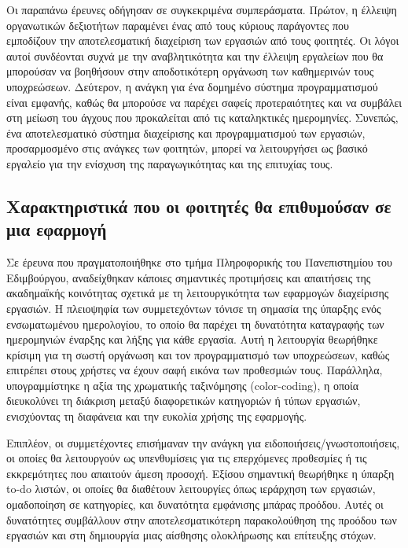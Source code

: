             Οι παραπάνω έρευνες οδήγησαν σε συγκεκριμένα συμπεράσματα. Πρώτον, η έλλειψη οργανωτικών δεξιοτήτων παραμένει ένας από τους κύριους παράγοντες που εμποδίζουν την αποτελεσματική διαχείριση των εργασιών από τους φοιτητές. Οι λόγοι αυτοί συνδέονται συχνά με την αναβλητικότητα και την έλλειψη εργαλείων που θα μπορούσαν να βοηθήσουν στην αποδοτικότερη οργάνωση των καθημερινών τους υποχρεώσεων. Δεύτερον, η ανάγκη για ένα δομημένο σύστημα προγραμματισμού είναι εμφανής, καθώς θα μπορούσε να παρέχει σαφείς προτεραιότητες και να συμβάλει στη μείωση του άγχους που προκαλείται από τις καταληκτικές ημερομηνίες. Συνεπώς, ένα αποτελεσματικό σύστημα διαχείρισης και προγραμματισμού των εργασιών, προσαρμοσμένο στις ανάγκες των φοιτητών, μπορεί να λειτουργήσει ως βασικό εργαλείο για την ενίσχυση της παραγωγικότητας και της επιτυχίας τους.

        \subsection{Χαρακτηριστικά που οι φοιτητές θα επιθυμούσαν σε μια εφαρμογή} \label{sec:student_preferences}
            Σε έρευνα \cite{Trujillo2020} που πραγματοποιήθηκε στο τμήμα Πληροφορικής του Πανεπιστημίου του Εδιμβούργου, αναδείχθηκαν κάποιες σημαντικές προτιμήσεις και απαιτήσεις της ακαδημαϊκής κοινότητας σχετικά με τη λειτουργικότητα των εφαρμογών διαχείρισης εργασιών. Η πλειοψηφία των συμμετεχόντων τόνισε τη σημασία της ύπαρξης ενός ενσωματωμένου ημερολογίου, το οποίο θα παρέχει τη δυνατότητα καταγραφής των ημερομηνιών έναρξης και λήξης για κάθε εργασία. Αυτή η λειτουργία θεωρήθηκε κρίσιμη για τη σωστή οργάνωση και τον προγραμματισμό των υποχρεώσεων, καθώς επιτρέπει στους χρήστες να έχουν σαφή εικόνα των προθεσμιών τους. Παράλληλα, υπογραμμίστηκε η αξία της χρωματικής ταξινόμησης (color-coding), η οποία διευκολύνει τη διάκριση μεταξύ διαφορετικών κατηγοριών ή τύπων εργασιών, ενισχύοντας τη διαφάνεια και την ευκολία χρήσης της εφαρμογής.

            Επιπλέον, οι συμμετέχοντες επισήμαναν την ανάγκη για ειδοποιήσεις/γνωστοποιήσεις, οι οποίες θα λειτουργούν ως υπενθυμίσεις για τις επερχόμενες προθεσμίες ή τις εκκρεμότητες που απαιτούν άμεση προσοχή. Εξίσου σημαντική θεωρήθηκε η ύπαρξη to-do λιστών, οι οποίες θα διαθέτουν λειτουργίες όπως ιεράρχηση των εργασιών, ομαδοποίηση σε κατηγορίες, και δυνατότητα εμφάνισης μπάρας προόδου. Αυτές οι δυνατότητες συμβάλλουν στην αποτελεσματικότερη παρακολούθηση της προόδου των εργασιών και στη δημιουργία μιας αίσθησης ολοκλήρωσης και επίτευξης στόχων.

